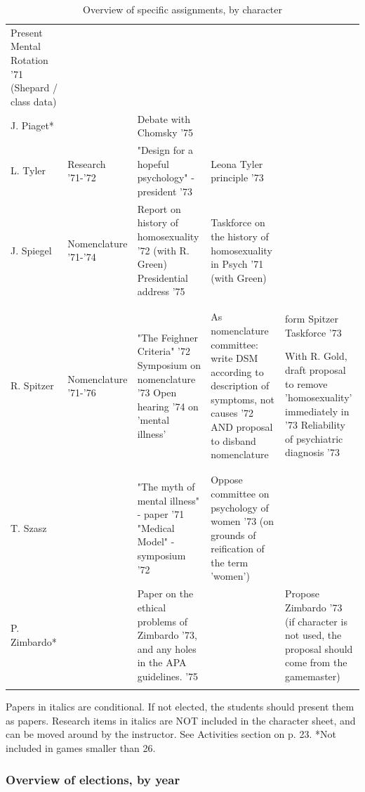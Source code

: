 \begin{longtable}[!t]{ | p{1cm} | p{2cm} | p{6cm} | p{3cm} | p{3cm} | }
Present Mental Rotation '71 (Shepard / class data)\\
J. Piaget*&
&
Debate with Chomsky '75&
&
\\
L. Tyler&
Research '71-'72&
"Design for a hopeful psychology" - president '73&
Leona Tyler principle '73&
\\
J. Spiegel&
Nomenclature '71-'74&
Report on history of homosexuality '72 (with R. Green)
Presidential address '75&
Taskforce on the history of homosexuality in Psych '71 (with Green)&
\\
R. Spitzer&
Nomenclature '71-'76&
"The Feighner Criteria" '72\newline
Symposium on nomenclature '73\newline
Open hearing '74 on 'mental illness'&

As nomenclature committee: write DSM according to description of symptoms, not causes '72
AND proposal to disband nomenclature & form Spitzer Taskforce '73\newline

With R. Gold, draft proposal to remove 'homosexuality' immediately in '73
Reliability of psychiatric diagnosis '73\\
T. Szasz&
&
"The myth of mental illness" - paper '71\newline
"Medical Model" - symposium '72&
Oppose committee on psychology of women '73 (on grounds of reification of the term 'women')&
\\
P. Zimbardo*&
&
Paper on the ethical problems of Zimbardo '73, \newline and any holes in the APA guidelines. '75&
&
Propose Zimbardo '73 (if character is not used, the proposal should come from the gamemaster)\\ \hline

\caption{Overview of specific assignments, by character}
\label{table: overviewcharacter}
\end{longtable}

Papers in italics are conditional. If not elected, the students should present them as papers.
Research items in italics are NOT included in the character sheet, and can be moved around by the instructor. See Activities section on p. 23.
*Not included in games smaller than 26.

\subsubsection{Overview of elections, by year}
\label{overviewofelectionsbyyear}

